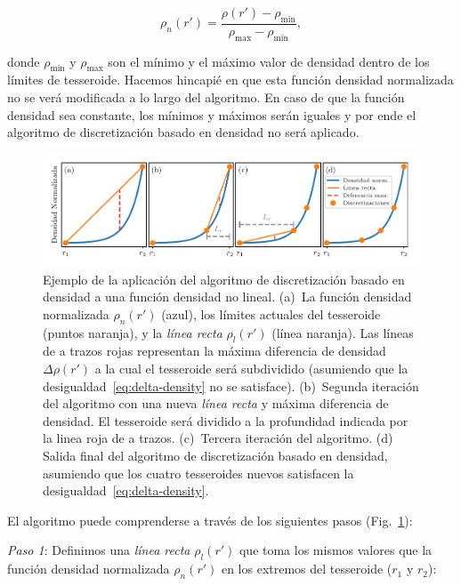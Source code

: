 \begin{equation}
    \rho_n(r') =
    \frac{\rho(r') - \rho_\text{min}}{\rho_\text{max} - \rho_\text{min}},
\end{equation}

\noindent donde $\rho_\text{min}$ y $\rho_\text{max}$ son el mínimo y el máximo
valor de densidad dentro de los límites de tesseroide.
Hacemos hincapié en que esta función densidad normalizada no se verá modificada
a lo largo del algoritmo.
En caso de que la función densidad sea constante, los mínimos y máximos serán
iguales y por ende el algoritmo de discretización basado en densidad no será
aplicado.

\begin{figure}
\centering
\includegraphics[width=\linewidth]{figs/tesseroids-variable-density/density-based-discretization-algorithm.pdf}
\caption{
    Ejemplo de la aplicación del algoritmo de discretización basado en densidad
    a una función densidad no lineal.
    (a)~La función densidad normalizada $\rho_n(r')$ (azul), los límites
    actuales del tesseroide (puntos naranja), y la \emph{línea recta}
    $\rho_l(r')$ (línea naranja).
    Las líneas de a trazos rojas representan la máxima diferencia de densidad
    $\Delta \rho (r')$ a la cual el tesseroide será subdividido (asumiendo que
    la desigualdad~\ref{eq:delta-density} no se satisface).
    (b)~Segunda iteración del algoritmo con una nueva \emph{línea recta}
    y máxima diferencia de densidad. El tesseroide será dividido a la
    profundidad indicada por la linea roja de a trazos.
    (c)~Tercera iteración del algoritmo.
    (d)~ Salida final del algoritmo de discretización basado en densidad,
    asumiendo que los cuatro tesseroides nuevos satisfacen la
    desigualdad~\ref{eq:delta-density}.
}
\label{fig:density-discretization-algorithm}
\end{figure}


El algoritmo puede comprenderse a través de los siguientes pasos
(Fig.~\ref{fig:density-discretization-algorithm}):

\textit{Paso 1}:
Definimos una \emph{línea recta} $\rho_l(r')$ que toma los mismos valores que
la función densidad normalizada $\rho_n(r')$ en los extremos del tesseroide
($r_1$ y $r_2$):

